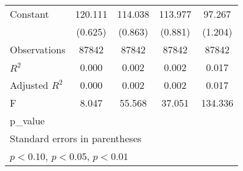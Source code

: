 {\begin{tabular}{l*{4}{c}}
\addlinespace
Constant            &     120.111\sym{***}&     114.038\sym{***}&     113.977\sym{***}&      97.267\sym{***}\\
                    &     (0.625)         &     (0.863)         &     (0.881)         &     (1.204)         \\
\midrule
Observations        &       87842         &       87842         &       87842         &       87842         \\
\(R^{2}\)           &       0.000         &       0.002         &       0.002         &       0.017         \\
Adjusted \(R^{2}\)  &       0.000         &       0.002         &       0.002         &       0.017         \\
F                   &       8.047         &      55.568         &      37.051         &     134.336         \\
p\_value             &                     &                     &                     &                     \\
\bottomrule
\multicolumn{5}{l}{\footnotesize Standard errors in parentheses}\\
\multicolumn{5}{l}{\footnotesize \sym{*} \(p<0.10\), \sym{**} \(p<0.05\), \sym{***} \(p<0.01\)}\\
\end{tabular}
}
